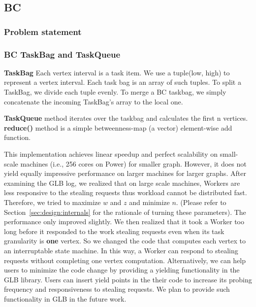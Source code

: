 \subsection{BC}
\label{sec:design:bc}
\subsubsection{Problem statement}

\subsubsection{BC TaskBag and TaskQueue}
\textbf{TaskBag} Each vertex interval is a task item. We use a tuple(low, high) to represent a vertex interval. Each task bag is an array of such tuples. To split a TaskBag, we divide each tuple evenly. To merge a BC taskbag, we simply concatenate the incoming TaskBag's array to the local one.  

\textbf{TaskQueue}   method iterates over the taskbag and calculates the first n vertices. 
\textbf{reduce()} method is a simple betweenness-map (a vector) element-wise add function.

This implementation achieves linear speedup and perfect scalability on
small-scale machines (i.e., 256 cores on Power) for smaller
graph. However, it does not yield equally impressive performance on larger machines for larger graphs. After examining the GLB log, we realized that on large scale machines, Workers are less responsive to the stealing requests thus workload cannot be distributed fast. Therefore, we tried to maximize $w$ and $z$ and minimize $n$. (Please refer to Section~\ref{sec:design:internals} for the rationale of turning these parameters). The performance only improved slightly.
We then realized that it took a Worker too long before it responded to the work stealing requests even when its task granularity is \textbf{one} vertex. So we changed the code that computes each vertex to an interruptable state machine. In this way, a Worker can respond to stealing requests without completing one vertex computation. Alternatively, we can help users to minimize the code change by providing a yielding functionality in the GLB library. Users can insert yield points in the their code to increase its probing frequency and responsiveness to stealing requests. We plan to provide such functionality in GLB in the future work.

